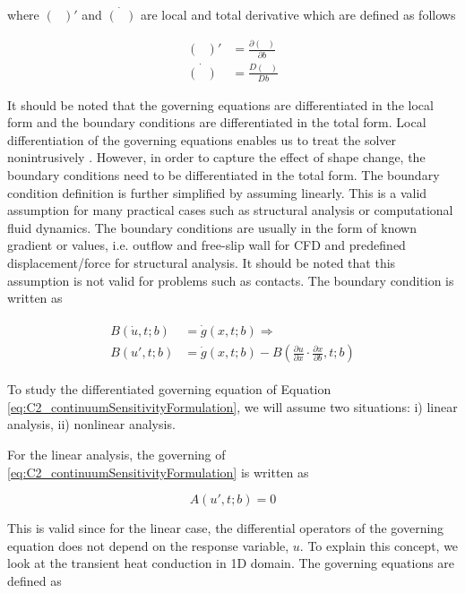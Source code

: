 where $(\text{ })'$ and $\dot{(\text{ })}$ are local and total derivative which are defined as follows

\begin{subequations}
\begin{align*}
	(\text{ })' &= \frac{\partial (\text{ })}{\partial b} \\
	\dot{(\text{ })} &= \frac{D (\text{ })}{D b}
\end{align*}
\end{subequations}

It should be noted that the governing equations are differentiated in the local form and the boundary conditions are differentiated in the total form. Local differentiation of the governing equations enables us to treat the solver nonintrusively \cite{cross2014local}. However, in order to capture the effect of shape change, the boundary conditions need to be differentiated in the total form. The boundary condition definition is further simplified by assuming linearly. This is a valid assumption for many practical cases such as structural analysis or computational fluid dynamics. The boundary conditions are usually in the form of known gradient or values, i.e. outflow and free-slip wall for CFD and predefined displacement/force for structural analysis. It should be noted that this assumption is not valid for problems such as contacts. The boundary condition is written as

\begin{align}\label{eq:C2_linearSAboundaryCondtions}
\begin{split}
	B(\dot{u}, t; b) &= \dot{g}(x, t; b) \Rightarrow \\
	B(u', t; b) &= \dot{g}(x, t; b) - B(\frac{\partial u}{\partial x} \cdot \frac{\partial x}{\partial b}, t; b)
\end{split}
\end{align}

To study the differentiated governing equation of Equation \eqref{eq:C2_continuumSensitivityFormulation}, we will assume two situations: i) linear analysis, ii) nonlinear analysis.

For the linear analysis, the governing  of \eqref{eq:C2_continuumSensitivityFormulation} is written as

\begin{equation}\label{eq:C2_linearSAgoverningEquation}
	A(u', t; b) = 0 
\end{equation}

This is valid since for the linear case, the differential operators of the governing equation does not depend on the response variable, $u$. To explain this concept, we look at the transient heat conduction in 1D domain. The governing equations are defined as


